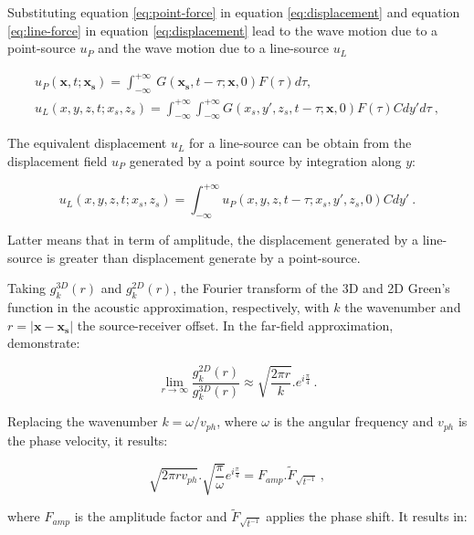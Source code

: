 \documentclass[manuscript,revised]{geophysics}
\begin{document}
\noindent Substituting equation \ref{eq:point-force} in equation \ref{eq:displacement} and equation \ref{eq:line-force} in equation \ref{eq:displacement} lead to the wave motion due to a point-source $u_{P}$ and the wave motion due to a line-source $u_{L}$ 

\begin{eqnarray}
	u_{P}(\mathbf{x},t;\mathbf{x_{s}})=\int_{-\infty}^{+\infty}\ G(\mathbf{x_{s}},t-\tau;\mathbf{x},0)F(\tau)d\tau, \label{eq:point-displacement} \\
	u_{L}(x,y,z,t;x_{s},z_{s})=\int_{-\infty}^{+\infty} \int_{-\infty}^{+\infty} G(x_{s},y',z_{s},t-\tau;\mathbf{x},0)F(\tau)Cdy'd\tau\ , \label{eq:line-displacement}
\end{eqnarray}

\noindent The equivalent displacement $u_{L}$ for a line-source can be obtain from the displacement field $u_{P}$ generated by a point source by integration along $y$:

\begin{equation}
	u_{L}(x,y,z,t;x_{s},z_{s})=\int_{-\infty}^{+\infty}u_{P}(x,y,z,t-\tau;x_{s},y',z_{s},0)Cdy'\ .
	\label{eq:line-point-relation}
\end{equation}

\noindent Latter means that in term of amplitude, the displacement generated by a line-source is greater than displacement generate by a point-source.
 
\noindent Taking $g_{k}^{3D}(r)$ and $g_{k}^{2D}(r)$, the Fourier transform of the 3D and 2D Green's function in the acoustic approximation, respectively, with $k$ the wavenumber and $r=|\mathbf{x}-\mathbf{x_{s}}|$ the source-receiver offset. In the far-field approximation, \citet{Forbriger_LSS_2014} demonstrate:

\begin{equation}
	\lim\limits_{r \rightarrow \infty} \frac{g_{k}^{2D}(r)}{g_{k}^{3D}(r)}\approx \sqrt{\frac{2\pi r}{k}}.e^{i\frac{\pi}{4}}\ .
	\label{eq:far-field-frac}
\end{equation}

\noindent Replacing the wavenumber $k=\omega/v_{ph}$, where $\omega$ is the angular frequency and $v_{ph}$ is the phase velocity, it results:

\begin{equation}
	\sqrt{2\pi r v_{ph}}.\sqrt{\frac{\pi}{\omega}}e^{i\frac{\pi}{4}}=F_{amp}.\widetilde{F}_{\sqrt{t^{-1}}}\ ,
\end{equation}

\noindent where $F_{amp}$ is the amplitude factor and $\widetilde{F}_{\sqrt{t^{-1}}}$ applies the phase shift. It results in:
\end{document}
